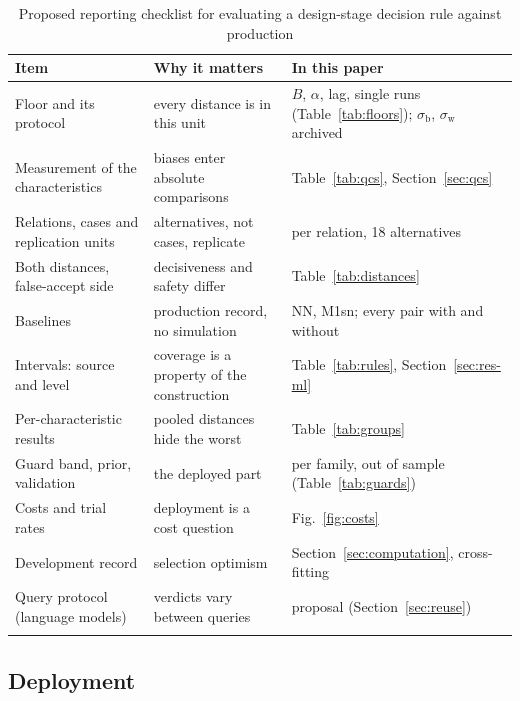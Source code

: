 \documentclass[pdflatex,sn-basic,lineno]{sn-jnl}
\newcommand{\tabsize}{\fontsize{8}{9.5}\selectfont}
\begin{document}
\begin{table}[t]
\tabsize
\setlength{\tabcolsep}{3pt}
\caption{Proposed reporting checklist for evaluating a design-stage decision rule against production}\label{tab:checklist}
\begin{tabular}{@{}L{3.3cm}L{4.6cm}L{4.4cm}@{}}
\toprule
Item & Why it matters & In this paper \\
\midrule
Floor and its protocol & every distance is in this unit & $B$, $\alpha$, lag, single runs (Table~\ref{tab:floors}); $\sigma_\mathrm{b}$, $\sigma_\mathrm{w}$ archived \\
Measurement of the characteristics & biases enter absolute comparisons & Table~\ref{tab:qcs}, Section~\ref{sec:qcs} \\
Relations, cases and replication units & alternatives, not cases, replicate & per relation, 18 alternatives \\
Both distances, false-accept side & decisiveness and safety differ & Table~\ref{tab:distances} \\
Baselines & production record, no simulation & NN, M1sn; every pair with and without \\
Intervals: source and level & coverage is a property of the construction & Table~\ref{tab:rules}, Section~\ref{sec:res-ml} \\
Per-characteristic results & pooled distances hide the worst & Table~\ref{tab:groups} \\
Guard band, prior, validation & the deployed part & per family, out of sample (Table~\ref{tab:guards}) \\
Costs and trial rates & deployment is a cost question & Fig.~\ref{fig:costs} \\
Development record & selection optimism & Section~\ref{sec:computation}, cross-fitting \\
Query protocol (language models) & verdicts vary between queries & proposal (Section~\ref{sec:reuse}) \\
\botrule
\end{tabular}
\end{table}

\subsection{Deployment}
\end{document}
